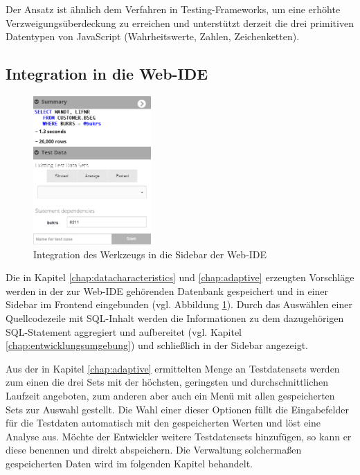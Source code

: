 Der Ansatz ist ähnlich dem Verfahren in Testing-Frameworks, um eine erhöhte Verzweigungsüberdeckung zu erreichen und unterstützt derzeit die drei primitiven Datentypen von JavaScript (Wahrheitswerte, Zahlen, Zeichenketten).

\subsection{Integration in die Web-IDE}
\begin{figure}[ht]
	\centering
  \includegraphics[width=0.4\textwidth]{figures/integration.png}
	\caption{Integration des Werkzeugs in die Sidebar der Web-IDE}
	\label{fig:ideintegration}
\end{figure}

Die in Kapitel \ref{chap:datacharacteristics} und \ref{chap:adaptive} erzeugten Vorschläge werden in der zur Web-IDE gehörenden Datenbank gespeichert und in einer Sidebar im Frontend eingebunden (vgl. Abbildung \ref{fig:ideintegration}).
Durch das Auswählen einer Quellcodezeile mit SQL-Inhalt werden die Informationen zu dem dazugehörigen SQL-Statement aggregiert und aufbereitet (vgl. Kapitel \ref{chap:entwicklungsumgebung}) und schließlich in der Sidebar angezeigt.

Aus der in Kapitel \ref{chap:adaptive} ermittelten Menge an Testdatensets werden zum einen die drei Sets mit der höchsten, geringsten und durchschnittlichen Laufzeit angeboten, zum anderen aber auch ein Menü mit allen gespeicherten Sets zur Auswahl gestellt.
Die Wahl einer dieser Optionen füllt die Eingabefelder für die Testdaten automatisch mit den gespeicherten Werten und löst eine Analyse aus.
Möchte der Entwickler weitere Testdatensets hinzufügen, so kann er diese benennen und direkt abspeichern.
Die Verwaltung solchermaßen gespeicherten Daten wird im folgenden Kapitel behandelt.
